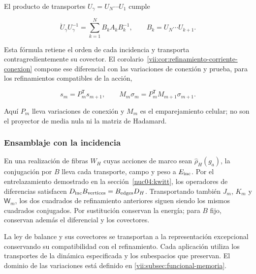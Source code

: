 El producto de transportes \(U_\gamma=U_N\cdots U_1\) cumple

\[
\dot U_\gamma U_\gamma^{-1}
=\sum_{k=1}^N B_kA_kB_k^{-1},\qquad B_k=U_N\cdots U_{k+1}.
\]

Esta fórmula retiene el orden de cada incidencia y transporta contragredientemente su covector. El corolario~\ref{vii:cor:refinamiento-corriente-conexion} compone ese diferencial con las variaciones de conexión y prueba, para los refinamientos compatibles de la acción,

\[
s_m=P_m^{\mathsf T}s_{m+1},\qquad
M_m\sigma_m=P_m^{\mathsf T}M_{m+1}\sigma_{m+1}.
\]

Aquí \(P_m\) lleva variaciones de conexión y \(M_m\) es el emparejamiento celular; no son el proyector de media nula ni la matriz de Hadamard.

\subsubsection{Ensamblaje con la incidencia}

En una realización de fibras \(W_H\) cuyas acciones de marco sean \(\widehat\rho_H(g_a)\), la conjugación por \(B\) lleva cada transporte, campo y peso a \(E_{\rm inc}\). Por el entrelazamiento demostrado en la sección~\ref{nuc04:kwitt}, los operadores de diferencias satisfacen \(D_{\rm inc}B_{\rm vertices}=B_{\rm edges}D_H\). Transportando también \(J_m\), \(K_m\) y \(\mathsf W_m\), los dos cuadrados de refinamiento anteriores siguen siendo los mismos cuadrados conjugados. Por sustitución conservan la energía; para \(B\) fijo, conservan además el diferencial y los covectores.

La ley de balance y sus covectores se transportan a la representación excepcional conservando su compatibilidad con el refinamiento. Cada aplicación utiliza los transportes de la dinámica especificada y los subespacios que preservan. El dominio de las variaciones está definido en \cref{vii:subsec:funcional-memoria}.
